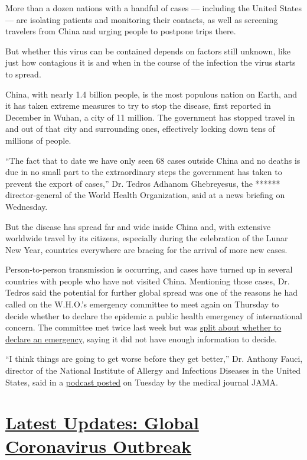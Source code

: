 More than a dozen nations with a handful of cases --- including the
United States --- are isolating patients and monitoring their contacts,
as well as screening travelers from China and urging people to postpone
trips there.

But whether this virus can be contained depends on factors still
unknown, like just how contagious it is and when in the course of the
infection the virus starts to spread.

China, with nearly 1.4 billion people, is the most populous nation on
Earth, and it has taken extreme measures to try to stop the disease,
first reported in December in Wuhan, a city of 11 million. The
government has stopped travel in and out of that city and surrounding
ones, effectively locking down tens of millions of people.

``The fact that to date we have only seen 68 cases outside China and no
deaths is due in no small part to the extraordinary steps the government
has taken to prevent the export of cases,'' Dr. Tedros Adhanom
Ghebreyesus, the ****** director-general of the World Health
Organization, said at a news briefing on Wednesday.

But the disease has spread far and wide inside China and, with extensive
worldwide travel by its citizens, especially during the celebration of
the Lunar New Year, countries everywhere are bracing for the arrival of
more new cases.

Person-to-person transmission is occurring, and cases have turned up in
several countries with people who have not visited China. Mentioning
those cases, Dr. Tedros said the potential for further global spread was
one of the reasons he had called on the W.H.O.'s emergency committee to
meet again on Thursday to decide whether to declare the epidemic a
public health emergency of international concern. The committee met
twice last week but was
\href{https://www.nytimes.com/2020/01/23/health/china-virus-who-emergency.html}{split
about whether to declare an emergency}, saying it did not have enough
information to decide.

``I think things are going to get worse before they get better,'' Dr.
Anthony Fauci, director of the National Institute of Allergy and
Infectious Diseases in the United States, said in a
\href{https://edhub.ama-assn.org/jn-learning/audio-player/18197306}{podcast
posted} on Tuesday by the medical journal JAMA.

\hypertarget{latest-updates-global-coronavirus-outbreak}{%
\section{\texorpdfstring{\href{https://www.nytimes.com/2020/08/01/world/coronavirus-covid-19.html?action=click\&pgtype=Article\&state=default\&region=MAIN_CONTENT_1\&context=storylines_live_updates}{Latest
Updates: Global Coronavirus
Outbreak}}{Latest Updates: Global Coronavirus Outbreak}}\label{latest-updates-global-coronavirus-outbreak}}


